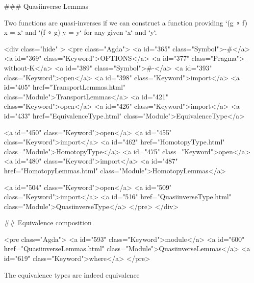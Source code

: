   ### Quasiinverse Lemmas

Two functions are quasi-inverses if we can construct a function providing
`(g ∘ f) x = x` and `(f ∘ g) y = y` for any given `x` and `y`.

<div class="hide" >
<pre class="Agda">
<a id="365" class="Symbol">{-#</a> <a id="369" class="Keyword">OPTIONS</a> <a id="377" class="Pragma">--without-K</a> <a id="389" class="Symbol">#-}</a>
<a id="393" class="Keyword">open</a> <a id="398" class="Keyword">import</a> <a id="405" href="TransportLemmas.html" class="Module">TransportLemmas</a>
<a id="421" class="Keyword">open</a> <a id="426" class="Keyword">import</a> <a id="433" href="EquivalenceType.html" class="Module">EquivalenceType</a>

<a id="450" class="Keyword">open</a> <a id="455" class="Keyword">import</a> <a id="462" href="HomotopyType.html" class="Module">HomotopyType</a>
<a id="475" class="Keyword">open</a> <a id="480" class="Keyword">import</a> <a id="487" href="HomotopyLemmas.html" class="Module">HomotopyLemmas</a>


<a id="504" class="Keyword">open</a> <a id="509" class="Keyword">import</a> <a id="516" href="QuasiinverseType.html" class="Module">QuasiinverseType</a>
</pre>
</div>

## Equivalence composition

<pre class="Agda">
<a id="593" class="Keyword">module</a> <a id="600" href="QuasiinverseLemmas.html" class="Module">QuasiinverseLemmas</a> <a id="619" class="Keyword">where</a>
</pre>

The equivalence types are indeed equivalence


